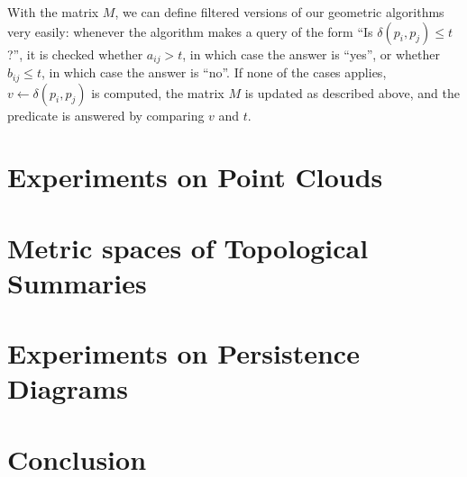 \documentclass[10pt]{article}
\newcommand{\metric}{\delta}
\begin{document}
\medskip

With the matrix $M$, we can define filtered versions of our geometric
algorithms very easily: whenever the algorithm makes a query of the form
``Is $\metric(p_i,p_j)\leq t$?'', it is checked whether $a_{ij}> t$,
in which case the answer is ``yes'', or whether $b_{ij}\leq t$,
in which case the answer is ``no''. If none of the cases applies, 
$v\gets\metric(p_i,p_j)$ is computed, 
the matrix $M$ is updated as described above, and the predicate is answered
by comparing $v$ and $t$.

\section{Experiments on Point Clouds}
\label{sec:experiments_point_cloud}

\section{Metric spaces of Topological Summaries}
\label{sec:metric_spaces_top_summaries}

\section{Experiments on Persistence Diagrams}
\label{sec:experiments_persistence_diagrams}

\section{Conclusion}
\label{sec:conclusion}




\end{document}
